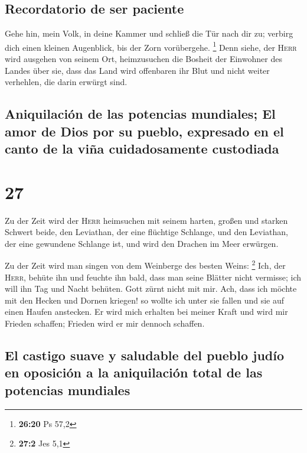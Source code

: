 \hypertarget{recordatorio-de-ser-paciente}{%
\subsection{Recordatorio de ser
paciente}\label{recordatorio-de-ser-paciente}}

 Gehe hin, mein Volk, in deine Kammer und schließ die Tür
nach dir zu; verbirg dich einen kleinen Augenblick, bis der Zorn
vorübergehe. \footnote{\textbf{26:20} Ps 57,2}  Denn
siehe, der \textsc{Herr} wird ausgehen von seinem Ort, heimzusuchen die
Bosheit der Einwohner des Landes über sie, dass das Land wird offenbaren
ihr Blut und nicht weiter verhehlen, die darin erwürgt sind.

\hypertarget{aniquilaciuxf3n-de-las-potencias-mundiales-el-amor-de-dios-por-su-pueblo-expresado-en-el-canto-de-la-viuxf1a-cuidadosamente-custodiada}{%
\subsection{Aniquilación de las potencias mundiales; El amor de Dios por
su pueblo, expresado en el canto de la viña cuidadosamente
custodiada}\label{aniquilaciuxf3n-de-las-potencias-mundiales-el-amor-de-dios-por-su-pueblo-expresado-en-el-canto-de-la-viuxf1a-cuidadosamente-custodiada}}

\hypertarget{section-26}{%
\section{27}\label{section-26}}

 Zu der Zeit wird der \textsc{Herr} heimsuchen mit seinem
harten, großen und starken Schwert beide, den Leviathan, der eine
flüchtige Schlange, und den Leviathan, der eine gewundene Schlange ist,
und wird den Drachen im Meer erwürgen.

 Zu der Zeit wird man singen von dem Weinberge des besten
Weins: \footnote{\textbf{27:2} Jes 5,1}  Ich, der
\textsc{Herr}, behüte ihn und feuchte ihn bald, dass man seine Blätter
nicht vermisse; ich will ihn Tag und Nacht behüten.  Gott
zürnt nicht mit mir. Ach, dass ich möchte mit den Hecken und Dornen
kriegen! so wollte ich unter sie fallen und sie auf einen Haufen
anstecken.  Er wird mich erhalten bei meiner Kraft und
wird mir Frieden schaffen; Frieden wird er mir dennoch schaffen.

\hypertarget{el-castigo-suave-y-saludable-del-pueblo-juduxedo-en-oposiciuxf3n-a-la-aniquilaciuxf3n-total-de-las-potencias-mundiales}{%
\subsection{El castigo suave y saludable del pueblo judío en oposición a
la aniquilación total de las potencias
mundiales}\label{el-castigo-suave-y-saludable-del-pueblo-juduxedo-en-oposiciuxf3n-a-la-aniquilaciuxf3n-total-de-las-potencias-mundiales}}

